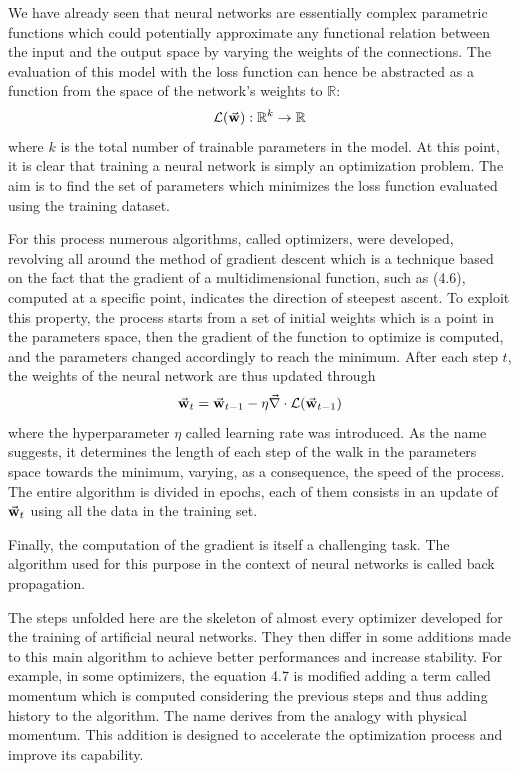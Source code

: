 \documentclass[a4paper,10pt]{report}
\begin{document}
We have already seen that neural networks are essentially complex parametric functions
which could potentially approximate any functional relation between the input and the
output space by varying the weights of the connections. The evaluation of this model
with the loss function can hence be abstracted as a function from the space of the 
network's weights to $\mathbb{R}$:
\begin{equation}
    \mathcal{L}(\va{w}): \mathbb{R}^k \rightarrow \mathbb{R}
\end{equation}
where $k$ is the total number of trainable parameters in the model.
At this point, it is clear that 
training a neural network is simply an optimization problem.
The aim is to find the set of parameters which minimizes the loss function evaluated using 
the training dataset.

For this process numerous algorithms, called optimizers, were developed, 
revolving all around the method of gradient descent
which is a technique based on the fact that the gradient of a multidimensional function, such as (4.6), computed
at a specific point, indicates the direction of steepest ascent.
To exploit this property, the process starts from a set of initial weights which is a point in the parameters space, 
then the gradient of the function to optimize is computed, and the parameters changed accordingly to reach the minimum.
After each step $t$, the weights of the neural network are thus updated through
\begin{equation}
    \va w_t = \va w_{t-1} - \eta \va \nabla \cdot \mathcal{L}(\va w_{t-1})
\end{equation}
where the hyperparameter $\eta$ called learning rate was introduced. As the name suggests, it determines 
the length of each step of the walk in the parameters space towards the minimum, varying, as a consequence,
the speed of the process. The entire algorithm is divided in epochs, each of them consists in an update of $\va w_t$
using all the data in the training set.

Finally, the computation of the gradient is itself a challenging task. The algorithm used for this purpose in the context 
of neural networks is called back propagation.

The steps unfolded here are the skeleton of almost every optimizer developed for the training of artificial neural 
networks. They then differ in some additions
made to this main algorithm to achieve better performances and increase stability.
For example, in some optimizers, the equation 4.7 is modified adding a term called momentum which is computed 
considering the previous steps and thus adding history to the algorithm. The name derives from the analogy with physical momentum.
This addition is designed to accelerate the optimization process and improve its capability.
\end{document}
